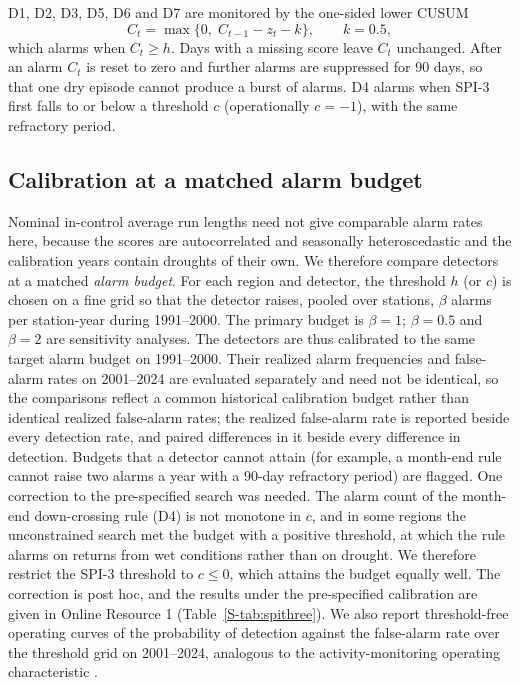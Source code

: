 \documentclass[pdflatex,sn-mathphys-ay]{sn-jnl}
\theoremstyle{thmstyletwo}
\begin{document}
D1, D2, D3, D5, D6 and D7 are monitored by the one-sided lower CUSUM \citep{page1954}
\begin{equation}\label{eq:cusum}
 C_t=\max\{0,\;C_{t-1}-z_t-k\},\qquad k=0.5,
\end{equation}
which alarms when $C_t\ge h$. Days with a missing score leave $C_t$ unchanged. After an alarm $C_t$ is
reset to zero and further alarms are suppressed for 90 days, so that one dry episode cannot produce a
burst of alarms. D4 alarms when SPI-3 first falls to or below a threshold $c$ (operationally $c=-1$),
with the same refractory period.

\subsection{Calibration at a matched alarm budget}\label{sec:calibration}
Nominal in-control average run lengths need not give comparable alarm rates here, because the scores
are autocorrelated and seasonally heteroscedastic and the calibration years contain droughts of their
own. We therefore
compare detectors at a matched \emph{alarm budget}. For each region and detector, the threshold $h$ (or
$c$) is chosen on a fine grid so that the detector raises, pooled over stations, $\beta$ alarms per
station-year during 1991--2000. The primary budget is $\beta=1$; $\beta=0.5$ and $\beta=2$ are
sensitivity analyses. The detectors are thus calibrated to the same target alarm budget on 1991--2000.
Their realized alarm frequencies and false-alarm rates on 2001--2024 are evaluated separately and need not
be identical, so the comparisons reflect a common historical calibration budget rather than identical
realized false-alarm rates; the realized false-alarm rate is reported beside every detection rate, and
paired differences in it beside every difference in detection. Budgets that a detector cannot
attain (for example, a month-end rule cannot raise two alarms a year with a 90-day refractory period)
are flagged. One correction to the pre-specified search was needed. The alarm count of the month-end
down-crossing rule (D4) is not monotone in $c$, and in some regions the unconstrained search met the budget
with a positive threshold, at which the rule alarms on returns from wet conditions rather than on drought.
We therefore restrict the SPI-3 threshold to $c\le0$, which attains the budget equally well. The
correction is post hoc, and the results under the pre-specified calibration are given in Online Resource
1 (Table~\ref{S-tab:spithree}). We also report threshold-free operating curves of the probability of detection against the
false-alarm rate over the threshold grid on 2001--2024, analogous to the activity-monitoring operating
characteristic \citep{fawcett1999}.
\end{document}
